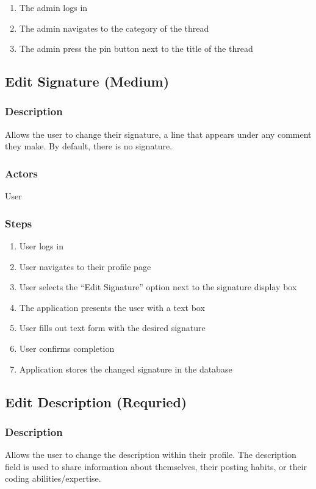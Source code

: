 \documentclass[12pt]{scrartcl}
\begin{document}
\begin{enumerate}
\item The admin logs in
\item The admin navigates to the category of the thread
\item The admin press the pin button next to the title of the thread
\end{enumerate}

\subsection{Edit Signature (Medium)}
\subsubsection{Description}
Allows the user to change their signature, a line that appears under any comment they make. By default, there is no signature.

\subsubsection{Actors}
User

\subsubsection{Steps}
\begin {enumerate}
\item User logs in
\item User navigates to their profile page
\item User selects the “Edit Signature” option next to the signature display box
\item The application presents the user with a text box
\item User fills out text form with the desired signature
\item User confirms completion
\item Application stores the changed signature in the database
\end {enumerate}

\subsection{Edit Description (Requried)}
\subsubsection{Description}
Allows the user to change the description within their profile.
The description field is used to share information about themselves, their posting habits, or their coding abilities/expertise.
\end{document}
